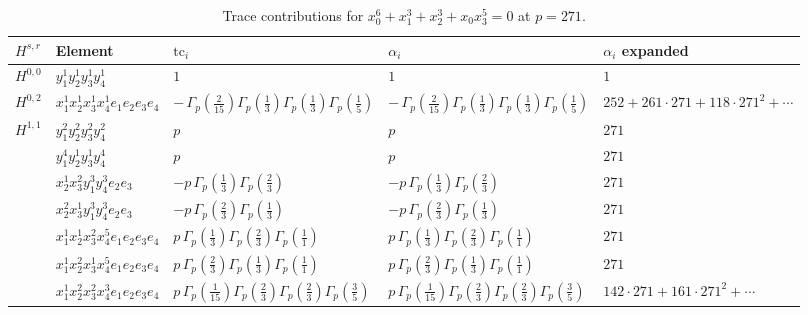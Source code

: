 \documentclass[11pt]{article}
\begin{document}
\begin{table}[ht]
\centering
\caption{Trace contributions for $x_0^{6} + x_1^{3} + x_2^{3} + x_0 x_3^{5} = 0$ at $p=271$.}\label{tab:deformed-5}
\renewcommand{\arraystretch}{1.1}
{\scriptsize
\begin{tabular}{@{}lllll@{}}
\toprule
$H^{s,r}$ & Element & $\mathrm{tc}_i$ & $\alpha_i$ & $\alpha_i$ expanded \\
\midrule
$H^{0,0}$ & $y_{1}^{1} y_{2}^{1} y_{3}^{1} y_{4}^{1}$ & $1$ & $1$ & $1$ \\
\midrule
$H^{0,2}$ & $x_{1}^{1} x_{2}^{1} x_{3}^{1} x_{4}^{1}  e_{1} e_{2} e_{3} e_{4}$ & $- \, \Gamma_p \left( \frac{2}{15} \right) \Gamma_p \left( \frac{1}{3} \right) \Gamma_p \left( \frac{1}{3} \right) \Gamma_p \left( \frac{1}{5} \right)$ & $- \, \Gamma_p \left( \frac{2}{15} \right) \Gamma_p \left( \frac{1}{3} \right) \Gamma_p \left( \frac{1}{3} \right) \Gamma_p \left( \frac{1}{5} \right)$ & $252{+}261{\cdot}271{+}118{\cdot}271^{2}{+}\cdots$ \\
\midrule
$H^{1,1}$ & $y_{1}^{2} y_{2}^{2} y_{3}^{2} y_{4}^{2}$ & $p \,$ & $p \,$ & $271$ \\
 & $y_{1}^{4} y_{2}^{1} y_{3}^{1} y_{4}^{4}$ & $p \,$ & $p \,$ & $271$ \\
 & $x_{2}^{1} x_{3}^{2} y_{1}^{3} y_{4}^{3} e_{2} e_{3}$ & $- p \, \Gamma_p \left( \frac{1}{3} \right) \Gamma_p \left( \frac{2}{3} \right)$ & $- p \, \Gamma_p \left( \frac{1}{3} \right) \Gamma_p \left( \frac{2}{3} \right)$ & $271$ \\
 & $x_{2}^{2} x_{3}^{1} y_{1}^{3} y_{4}^{3} e_{2} e_{3}$ & $- p \, \Gamma_p \left( \frac{2}{3} \right) \Gamma_p \left( \frac{1}{3} \right)$ & $- p \, \Gamma_p \left( \frac{2}{3} \right) \Gamma_p \left( \frac{1}{3} \right)$ & $271$ \\
 & $x_{1}^{1} x_{2}^{1} x_{3}^{2} x_{4}^{5}  e_{1} e_{2} e_{3} e_{4}$ & $p \, \Gamma_p \left( \frac{1}{3} \right) \Gamma_p \left( \frac{2}{3} \right) \Gamma_p \left( \frac{1}{1} \right)$ & $p \, \Gamma_p \left( \frac{1}{3} \right) \Gamma_p \left( \frac{2}{3} \right) \Gamma_p \left( \frac{1}{1} \right)$ & $271$ \\
 & $x_{1}^{1} x_{2}^{2} x_{3}^{1} x_{4}^{5}  e_{1} e_{2} e_{3} e_{4}$ & $p \, \Gamma_p \left( \frac{2}{3} \right) \Gamma_p \left( \frac{1}{3} \right) \Gamma_p \left( \frac{1}{1} \right)$ & $p \, \Gamma_p \left( \frac{2}{3} \right) \Gamma_p \left( \frac{1}{3} \right) \Gamma_p \left( \frac{1}{1} \right)$ & $271$ \\
 & $x_{1}^{1} x_{2}^{2} x_{3}^{2} x_{4}^{3}  e_{1} e_{2} e_{3} e_{4}$ & $p \, \Gamma_p \left( \frac{1}{15} \right) \Gamma_p \left( \frac{2}{3} \right) \Gamma_p \left( \frac{2}{3} \right) \Gamma_p \left( \frac{3}{5} \right)$ & $p \, \Gamma_p \left( \frac{1}{15} \right) \Gamma_p \left( \frac{2}{3} \right) \Gamma_p \left( \frac{2}{3} \right) \Gamma_p \left( \frac{3}{5} \right)$ & $142{\cdot}271{+}161{\cdot}271^{2}{+}\cdots$ \\

\end{tabular}}
\end{table}
\end{document}
